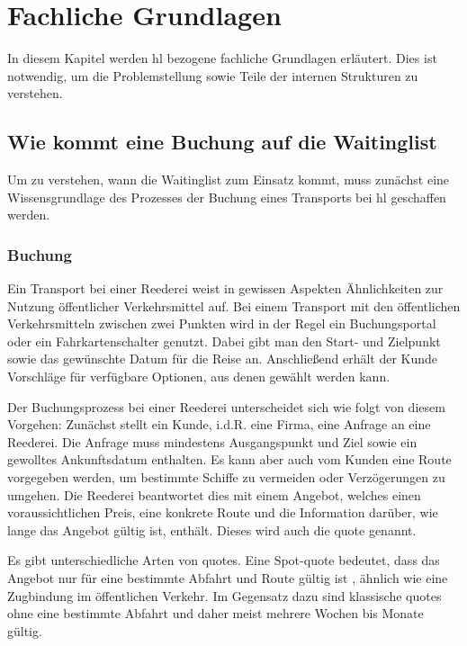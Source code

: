 \chapter{Fachliche Grundlagen}
In diesem Kapitel werden \gls{hl} bezogene fachliche Grundlagen erläutert. Dies ist notwendig, um die Problemstellung sowie Teile der internen Strukturen zu verstehen.

\section{Wie kommt eine Buchung auf die Waitinglist}
Um zu verstehen, wann die Waitinglist zum Einsatz kommt, muss zunächst eine Wissensgrundlage des Prozesses der Buchung eines Transports bei \gls{hl} geschaffen werden.
\subsection{Buchung}

Ein Transport bei einer Reederei weist in gewissen Aspekten Ähnlichkeiten zur Nutzung öffentlicher Verkehrsmittel auf. 
Bei einem Transport mit den öffentlichen Verkehrsmitteln zwischen zwei Punkten wird in der Regel ein Buchungsportal oder ein Fahrkartenschalter genutzt. 
Dabei gibt man den Start- und Zielpunkt sowie das gewünschte Datum für die Reise an. Anschließend erhält der Kunde Vorschläge für verfügbare Optionen, aus denen gewählt werden kann.

Der Buchungsprozess bei einer Reederei unterscheidet sich wie folgt von diesem Vorgehen:
Zunächst stellt ein Kunde, i.d.R. eine Firma, eine Anfrage an eine Reederei. 
Die Anfrage muss mindestens Ausgangspunkt und Ziel sowie ein gewolltes Ankunftsdatum enthalten. 
Es kann aber auch vom Kunden eine Route vorgegeben werden, um bestimmte Schiffe zu vermeiden oder Verzögerungen zu umgehen.
Die Reederei beantwortet dies mit einem Angebot, welches einen voraussichtlichen Preis, eine konkrete Route und die Information darüber, wie lange das Angebot gültig ist, enthält. Dieses wird auch die \gls{quote} genannt. 

Es gibt unterschiedliche Arten von \glspl{quote}. Eine Spot-\gls{quote} bedeutet, dass das Angebot nur für eine bestimmte Abfahrt und Route gültig ist \cite{hapaglloyd_quick_quotes}, ähnlich wie eine Zugbindung im öffentlichen Verkehr. Im Gegensatz dazu sind klassische \glspl{quote} ohne eine bestimmte Abfahrt und daher meist mehrere Wochen bis Monate gültig.

